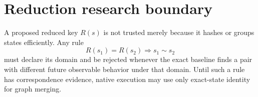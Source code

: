 \documentclass{article}
\begin{document}
\section{Reduction research boundary}

A proposed reduced key $R(s)$ is not trusted merely because it hashes or groups
states efficiently. Any rule
\[
  R(s_1)=R(s_2)\Longrightarrow s_1\sim s_2
\]
must declare its domain and be rejected whenever the exact baseline finds a pair
with different future observable behavior under that domain. Until such a rule
has correspondence evidence, native execution may use only exact-state identity
for graph merging.
\end{document}
